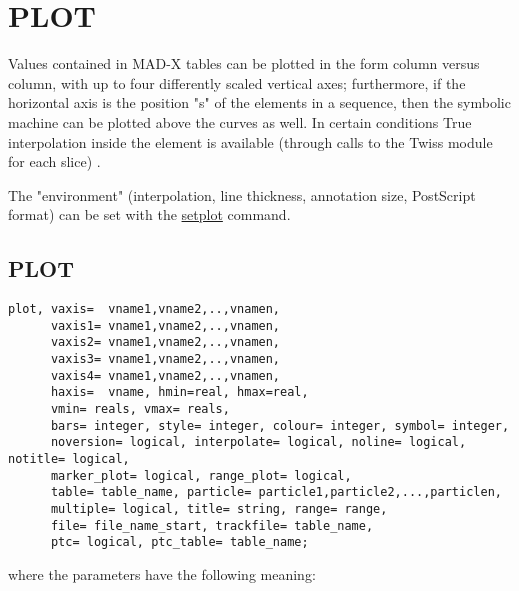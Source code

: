 
\chapter{PLOT}

Values contained in MAD-X tables can be plotted in the form column
versus column, with up to four differently scaled vertical axes;
furthermore, if the horizontal axis is the position "s" of the elements
in a sequence, then the symbolic machine can be plotted above the curves
as well. In certain conditions True interpolation inside the element is
available (through calls to the Twiss module for each slice) .  

The "environment" (interpolation, line thickness, annotation size,
PostScript format) can be set with the \hyperlink{setplot}{setplot}
command.   


\section{PLOT}	
\begin{verbatim}
plot, vaxis=  vname1,vname2,..,vnamen,
      vaxis1= vname1,vname2,..,vnamen, 
      vaxis2= vname1,vname2,..,vnamen,
      vaxis3= vname1,vname2,..,vnamen, 
      vaxis4= vname1,vname2,..,vnamen,
      haxis=  vname, hmin=real, hmax=real, 
      vmin= reals, vmax= reals, 
      bars= integer, style= integer, colour= integer, symbol= integer, 
      noversion= logical, interpolate= logical, noline= logical, notitle= logical, 
      marker_plot= logical, range_plot= logical, 
      table= table_name, particle= particle1,particle2,...,particlen,
      multiple= logical, title= string, range= range, 
      file= file_name_start, trackfile= table_name,
      ptc= logical, ptc_table= table_name; 
\end{verbatim} 

where the parameters have the following meaning: 

